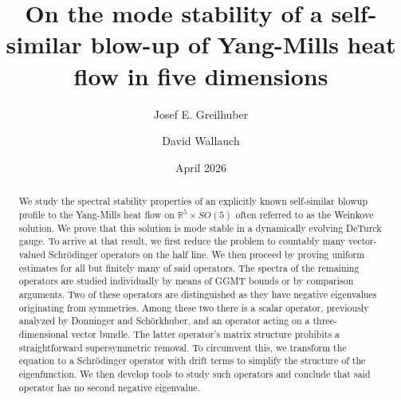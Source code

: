 \documentclass[11pt,reqno]{amsart}
\title[Mode stability of a self-similar Yang-Mills blow-up]{On the mode stability of a self-similar blow-up of Yang-Mills heat flow in five dimensions}
\author{Josef E. Greilhuber}
\author{David Wallauch}
\date{April 2026}
\theoremstyle{remark}
\newcommand{\R}{\mathbb{R}}
\theoremstyle{definition}
\begin{document}
\begin{abstract}
 We study the spectral stability properties of an explicitly known self-similar blowup profile to the Yang-Mills heat flow on $\R^5\times SO(5)$ often referred to as the Weinkove solution. We prove that this solution is mode stable in a dynamically evolving DeTurck gauge. To arrive at that result, we first reduce the problem to countably many vector-valued Schrödinger operators on the half line. We then proceed by proving uniform estimates for all but finitely many of said operators. The spectra of the remaining operators are studied individually by means of GGMT bounds or by comparison arguments. Two of these operators are distinguished as they have negative eigenvalues originating from symmetries. Among these two there is a scalar operator, previously analyzed by Donninger and Sch\"orkhuber, and an operator acting on a three-dimensional vector bundle. The latter operator's matrix structure prohibits a straightforward supersymmetric removal. To circumvent this, we transform the equation to a Schrödinger operator with drift terms to simplify the structure of the eigenfunction. We then develop tools to study such operators and conclude that said operator has no second negative eigenvalue.
\end{abstract}
\maketitle
\end{document}
